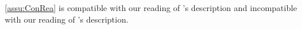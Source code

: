 \begin{note}
  \autoref{assu:ConRea} is compatible with our reading of \citeauthor{Bratman:1979aa}'s description and incompatible with our reading of \citeauthor{Gardner:1986wp}'s description.




\end{note}

